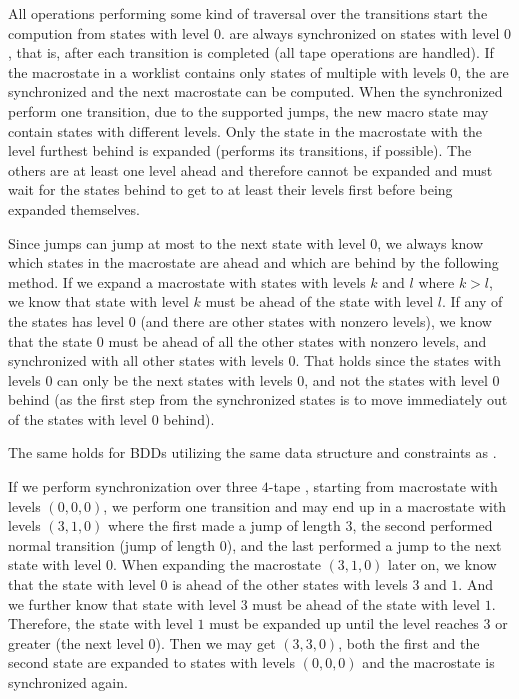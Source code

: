 All operations performing some kind of traversal over the transitions start the compution from states with level $0$.
\nfts are always synchronized on states with level $0$, that is, after each \nft transition is completed (all tape operations are handled).
If the macrostate in a worklist contains only states of multiple \nfts with levels $0$, the \nfts are synchronized and the next macrostate can be computed.
When the synchronized \nfts perform one transition, due to the supported jumps, the new macro state may contain states with different levels.
Only the state in the macrostate with the level furthest behind is expanded (performs its transitions, if possible).
The others are at least one level ahead and therefore cannot be expanded and must wait for the states behind to get to at least their levels first before being expanded themselves.

Since jumps can jump at most to the next state with level $0$, we always know which states in the macrostate are ahead and which are behind by the following method.
If we expand a macrostate with states with levels $k$ and $l$ where $k > l$, we know that state with level $k$ must be ahead of the state with level $l$.
If any of the states has level $0$ (and there are other states with nonzero levels), we know that the state $0$ must be ahead of all the other states with nonzero levels, and synchronized with all other states with levels $0$.
That holds since the states with levels $0$ can only be the next states with levels $0$, and not the states with level $0$ behind (as the first step from the synchronized states is to move immediately out of the states with level $0$ behind).

The same holds for BDDs utilizing the same data structure and constraints as \nfts.

\begin{example}
  If we perform synchronization over three $4$-tape \nfts, starting from macrostate with levels $(0, 0, 0)$, we perform one transition and may end up in a macrostate with levels $(3, 1, 0)$ where the first \nft made a jump of length $3$, the second performed normal transition (jump of length $0$), and the last \nft performed a jump to the next state with level $0$.
  When expanding the macrostate $(3, 1, 0)$ later on, we know that the state with level $0$ is ahead of the other states with levels $3$ and $1$. And we further know that state with level $3$ must be ahead of the state with level $1$. Therefore, the state with level $1$ must be expanded up until the level reaches $3$ or greater (the next level $0$).
  Then we may get $(3, 3, 0)$, both the first and the second state are expanded to states with levels $(0, 0, 0)$ and the macrostate is synchronized again.
\end{example}

